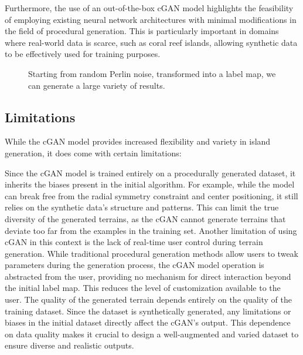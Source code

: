 Furthermore, the use of an out-of-the-box cGAN model highlights the feasibility of employing existing neural network architectures with minimal modifications in the field of procedural generation. This is particularly important in domains where real-world data is scarce, such as coral reef islands, allowing synthetic data to be effectively used for training purposes.

\begin{figure}
    \caption{Starting from random Perlin noise, transformed into a label map, we can generate a large variety of results. }
    \label{fig:coral-island-perlin-examples}
\end{figure}


\subsection{Limitations}
\label{sec:coral-island-limitations}

While the cGAN model provides increased flexibility and variety in island generation, it does come with certain limitations:

\begin{Itemize}
     Since the cGAN model is trained entirely on a procedurally generated dataset, it inherits the biases present in the initial algorithm. For example, while the model can break free from the radial symmetry constraint and center positioning, it still relies on the synthetic data's structure and patterns. This can limit the true diversity of the generated terrains, as the cGAN cannot generate terrains that deviate too far from the examples in the training set.
     Another limitation of using cGAN in this context is the lack of real-time user control during terrain generation. While traditional procedural generation methods allow users to tweak parameters during the generation process, the cGAN model operation is abstracted from the user, providing no mechanism for direct interaction beyond the initial label map. This reduces the level of customization available to the user. 
     The quality of the generated terrain depends entirely on the quality of the training dataset. Since the dataset is synthetically generated, any limitations or biases in the initial dataset directly affect the cGAN's output. This dependence on data quality makes it crucial to design a well-augmented and varied dataset to ensure diverse and realistic outputs.
\end{Itemize}

